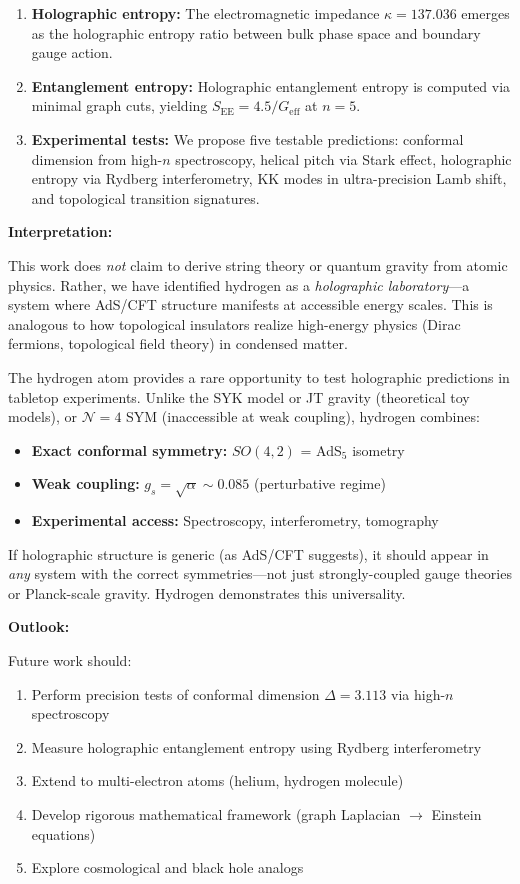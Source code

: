 \documentclass[aps,prd,twocolumn,superscriptaddress,floatfix]{revtex4-2}
\begin{document}
\begin{enumerate}
\item \textbf{Holographic entropy:} The electromagnetic impedance $\kappa = 137.036$ emerges as the holographic entropy ratio between bulk phase space and boundary gauge action.

\item \textbf{Entanglement entropy:} Holographic entanglement entropy is computed via minimal graph cuts, yielding $S_{\text{EE}} = 4.5/G_{\text{eff}}$ at $n=5$.

\item \textbf{Experimental tests:} We propose five testable predictions: conformal dimension from high-$n$ spectroscopy, helical pitch via Stark effect, holographic entropy via Rydberg interferometry, KK modes in ultra-precision Lamb shift, and topological transition signatures.
\end{enumerate}

\textbf{Interpretation:}

This work does \textit{not} claim to derive string theory or quantum gravity from atomic physics. Rather, we have identified hydrogen as a \textit{holographic laboratory}---a system where AdS/CFT structure manifests at accessible energy scales. This is analogous to how topological insulators realize high-energy physics (Dirac fermions, topological field theory) in condensed matter.

The hydrogen atom provides a rare opportunity to test holographic predictions in tabletop experiments. Unlike the SYK model or JT gravity (theoretical toy models), or $\mathcal{N}=4$ SYM (inaccessible at weak coupling), hydrogen combines:
\begin{itemize}
\item \textbf{Exact conformal symmetry:} $SO(4,2)$ = AdS$_5$ isometry
\item \textbf{Weak coupling:} $g_s = \sqrt{\alpha} \sim 0.085$ (perturbative regime)
\item \textbf{Experimental access:} Spectroscopy, interferometry, tomography
\end{itemize}

If holographic structure is generic (as AdS/CFT suggests), it should appear in \textit{any} system with the correct symmetries---not just strongly-coupled gauge theories or Planck-scale gravity. Hydrogen demonstrates this universality.

\textbf{Outlook:}

Future work should:
\begin{enumerate}
\item Perform precision tests of conformal dimension $\Delta = 3.113$ via high-$n$ spectroscopy
\item Measure holographic entanglement entropy using Rydberg interferometry
\item Extend to multi-electron atoms (helium, hydrogen molecule)
\item Develop rigorous mathematical framework (graph Laplacian $\to$ Einstein equations)
\item Explore cosmological and black hole analogs
\end{enumerate}
\end{document}
